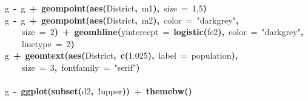 \documentclass{article}
\makeatletter
\newcommand{\hlnumber}[1]{\textcolor[rgb]{0,0,0}{#1}}%
\newcommand{\hlfunctioncall}[1]{\textcolor[rgb]{.5,0,.33}{\textbf{#1}}}%
\newcommand{\hlstring}[1]{\textcolor[rgb]{.6,.6,1}{#1}}%
\newcommand{\hlkeyword}[1]{\textbf{#1}}%
\newcommand{\hlargument}[1]{\textcolor[rgb]{.69,.25,.02}{#1}}%
\newcommand{\hlassignement}[1]{\textbf{#1}}%
\newcommand{\hlsymbol}[1]{#1}%
\newcommand{\hlstd}[1]{\textcolor[rgb]{0,0,0}{#1}}%
\newenvironment{kframe}{%
 \def\FrameCommand##1{\hskip\@totalleftmargin \hskip-\fboxsep
 \colorbox{shadecolor}{##1}\hskip-\fboxsep
     \hskip-\linewidth \hskip-\@totalleftmargin \hskip\columnwidth}%
 \MakeFramed {\advance\hsize-\width
   \@totalleftmargin\z@ \linewidth\hsize
   \@setminipage}}%
 {\par\unskip\endMakeFramed}
\newenvironment{knitrout}{}{} %
\makeatother
\begin{document}
\begin{knitrout}
{\begin{kframe}
\begin{flushleft}
\hlstd{}\hlsymbol{g}{\ }\hlassignement{\usebox{\hlnormalsizeboxlessthan}-}{\ }\hlsymbol{g}{\ }\hlkeyword{+}{\ }\hlfunctioncall{geom\usebox{\hlnormalsizeboxunderscore}point}\hlkeyword{(}\hlfunctioncall{aes}\hlkeyword{(}\hlsymbol{District}\hlkeyword{,}{\ }\hlsymbol{m1}\hlkeyword{)}\hlkeyword{,}{\ }\hlargument{size}{\ }\hlargument{=}{\ }\hlnumber{1.5}\hlkeyword{)}\hspace*{\fill}\\
\hlstd{}\hlsymbol{g}{\ }\hlassignement{\usebox{\hlnormalsizeboxlessthan}-}{\ }\hlsymbol{g}{\ }\hlkeyword{+}{\ }\hlfunctioncall{geom\usebox{\hlnormalsizeboxunderscore}point}\hlkeyword{(}\hlfunctioncall{aes}\hlkeyword{(}\hlsymbol{District}\hlkeyword{,}{\ }\hlsymbol{m2}\hlkeyword{)}\hlkeyword{,}{\ }\hlargument{color}{\ }\hlargument{=}{\ }\hlstring{"{}darkgrey"{}}\hlkeyword{,}\hspace*{\fill}\\
\hlstd{}{\ }{\ }{\ }{\ }\hlargument{size}{\ }\hlargument{=}{\ }\hlnumber{2}\hlkeyword{)}{\ }\hlkeyword{+}{\ }\hlfunctioncall{geom\usebox{\hlnormalsizeboxunderscore}hline}\hlkeyword{(}\hlargument{yintercept}{\ }\hlargument{=}{\ }\hlfunctioncall{logistic}\hlkeyword{(}\hlsymbol{fe2}\hlkeyword{)}\hlkeyword{,}{\ }\hlargument{color}{\ }\hlargument{=}{\ }\hlstring{"{}darkgrey"{}}\hlkeyword{,}\hspace*{\fill}\\
\hlstd{}{\ }{\ }{\ }{\ }\hlargument{linetype}{\ }\hlargument{=}{\ }\hlnumber{2}\hlkeyword{)}\hspace*{\fill}\\
\hlstd{}\hlsymbol{g}{\ }\hlkeyword{+}{\ }\hlfunctioncall{geom\usebox{\hlnormalsizeboxunderscore}text}\hlkeyword{(}\hlfunctioncall{aes}\hlkeyword{(}\hlsymbol{District}\hlkeyword{,}{\ }\hlfunctioncall{c}\hlkeyword{(}\hlnumber{1.025}\hlkeyword{)}\hlkeyword{,}{\ }\hlargument{label}{\ }\hlargument{=}{\ }\hlsymbol{population}\hlkeyword{)}\hlkeyword{,}\hspace*{\fill}\\
\hlstd{}{\ }{\ }{\ }{\ }\hlargument{size}{\ }\hlargument{=}{\ }\hlnumber{3}\hlkeyword{,}{\ }\hlargument{fontfamily}{\ }\hlargument{=}{\ }\hlstring{"{}serif"{}}\hlkeyword{)}\hspace*{\fill}\\
\hlstd{}\hspace*{\fill}\\
\hlstd{}\hlsymbol{g}{\ }\hlassignement{\usebox{\hlnormalsizeboxlessthan}-}{\ }\hlfunctioncall{ggplot}\hlkeyword{(}\hlfunctioncall{subset}\hlkeyword{(}\hlsymbol{d2}\hlkeyword{,}{\ }\hlkeyword{!}\hlsymbol{upper}\hlkeyword{)}\hlkeyword{)}{\ }\hlkeyword{+}{\ }\hlfunctioncall{theme\usebox{\hlnormalsizeboxunderscore}bw}\hlkeyword{(}\hlkeyword{)}\hspace*{\fill}\\

\end{flushleft}
\end{kframe}}
\end{knitrout}
\end{document}
